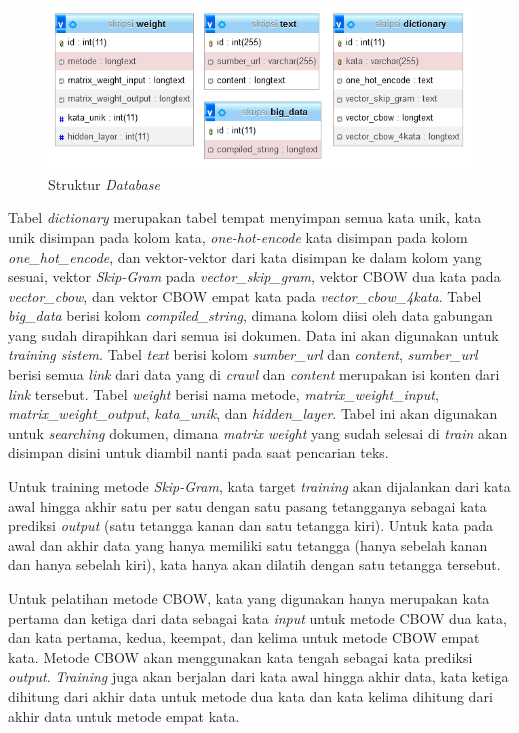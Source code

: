 \documentclass[12pt]{report}
\begin{document}
\begin{figure}[H]
\centering
\includegraphics[scale=0.75]{struktur_database}
\caption{Struktur \textit{Database}}
\label{strukturdatabase}
\end{figure}

Tabel \textit{dictionary} merupakan tabel tempat menyimpan semua kata unik, kata unik disimpan pada kolom kata, \textit{one-hot-encode} kata disimpan pada kolom \textit{one\_hot\_encode}, dan vektor-vektor dari kata disimpan ke dalam kolom yang sesuai, vektor \textit{Skip-Gram} pada \textit{vector\_skip\_gram}, vektor CBOW dua kata pada \textit{vector\_cbow}, dan vektor CBOW empat kata pada \textit{vector\_cbow\_4kata}. Tabel \textit{big\_data} berisi kolom \textit{compiled\_string}, dimana kolom diisi oleh data gabungan yang sudah dirapihkan dari semua isi dokumen. Data ini akan digunakan untuk \textit{training sistem}. Tabel \textit{text} berisi kolom \textit{sumber\_url} dan \textit{content}, \textit{sumber\_url} berisi semua \textit{link} dari data yang di \textit{crawl} dan \textit{content} merupakan isi konten dari \textit{link} tersebut. Tabel \textit{weight} berisi nama metode, \textit{matrix\_weight\_input}, \textit{matrix\_weight\_output}, \textit{kata\_unik}, dan \textit{hidden\_layer}. Tabel ini akan digunakan untuk \textit{searching} dokumen, dimana \textit{matrix weight} yang sudah selesai di \textit{train} akan disimpan disini untuk diambil nanti pada saat pencarian teks. 

Untuk training metode \textit{Skip-Gram}, kata target \textit{training} akan dijalankan dari kata awal hingga akhir satu per satu dengan satu pasang tetangganya sebagai kata prediksi \textit{output} (satu tetangga kanan dan satu tetangga kiri). Untuk kata pada awal dan akhir data yang hanya memiliki satu tetangga (hanya sebelah kanan dan hanya sebelah kiri), kata hanya akan dilatih dengan satu tetangga tersebut.

Untuk pelatihan metode CBOW, kata yang digunakan hanya merupakan kata pertama dan ketiga dari data sebagai kata \textit{input} untuk metode CBOW dua kata, dan kata pertama, kedua, keempat, dan kelima untuk metode CBOW empat kata. Metode CBOW akan menggunakan kata tengah sebagai kata prediksi \textit{output}. \textit{Training} juga akan berjalan dari kata awal hingga akhir data, kata ketiga dihitung dari akhir data untuk metode dua kata dan kata kelima dihitung dari akhir data untuk metode empat kata.
\end{document}
